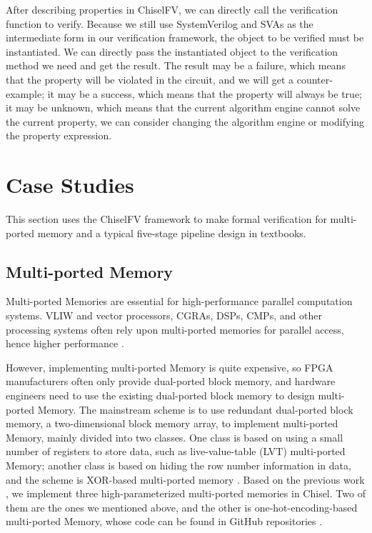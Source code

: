 \documentclass[conference]{IEEEtran}
\theoremstyle{definition}
\begin{document}
After describing properties in ChiselFV, we can directly call the verification function to verify. Because we still use SystemVerilog and SVAs as the intermediate form in our verification framework, the object to be verified must be instantiated. We can directly pass the instantiated object to the verification method we need and get the result. The result may be a failure, which means that the property will be violated in the circuit, and we will get a counter-example; it may be a success, which means that the property will always be true; it may be unknown, which means that the current algorithm engine cannot solve the current property, we can consider changing the algorithm engine or modifying the property expression.

\section{Case Studies}

This section uses the ChiselFV framework to make formal verification for multi-ported memory and a typical five-stage pipeline design in textbooks.

\subsection{Multi-ported Memory}

Multi-ported Memories are essential for high-performance parallel computation systems. VLIW and vector processors, CGRAs, DSPs, CMPs, and other processing systems often rely upon multi-ported memories for parallel access, hence higher performance \cite{abdelhadi2014modular}. 

However, implementing multi-ported Memory is quite expensive, so FPGA manufacturers often only provide dual-ported block memory, and hardware engineers need to use the existing dual-ported block memory to design multi-ported Memory. The mainstream scheme is to use redundant dual-ported block memory, a two-dimensional block memory array, to implement multi-ported Memory, mainly divided into two classes. One class is based on using a small number of registers to store data, such as live-value-table (LVT) multi-ported Memory; another class is based on hiding the row number information in data, and the scheme is XOR-based multi-ported memory \cite{laforest2012multi}. 
Based on the previous work \cite{xiang2022parameterized}, we implement three high-parameterized multi-ported memories in Chisel. Two of them are the ones we mentioned above, and the other is one-hot-encoding-based multi-ported Memory, whose code can be found in GitHub repositories \cite{mpMemory}.
\end{document}
